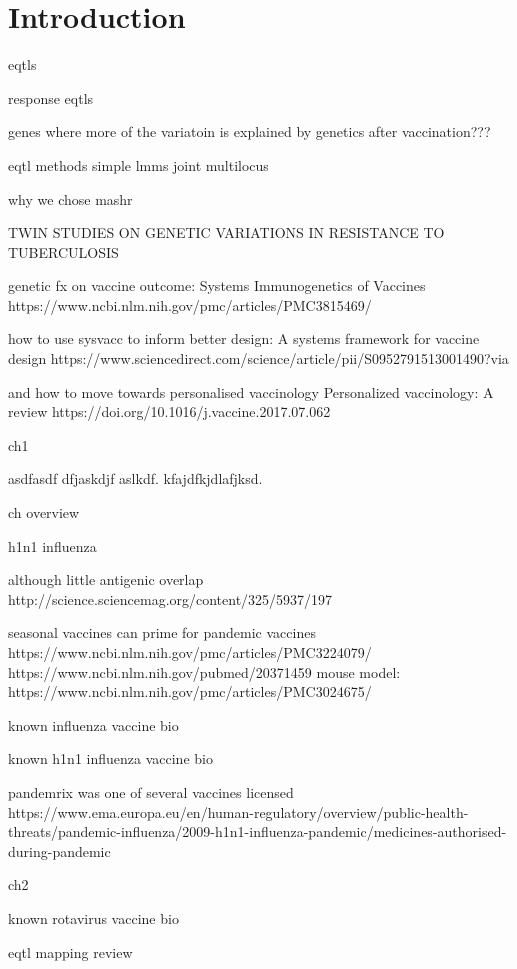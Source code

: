 %
%

\chapter{Introduction}

eqtls

response eqtls

    genes where more of the variatoin is explained by genetics after vaccination???

eqtl methods
simple
lmms
joint
multilocus

why we chose mashr

TWIN STUDIES ON GENETIC VARIATIONS IN RESISTANCE TO TUBERCULOSIS 

\autocite{Sobolev2016}




genetic fx on vaccine outcome:
Systems Immunogenetics of Vaccines
https://www.ncbi.nlm.nih.gov/pmc/articles/PMC3815469/

how to use sysvacc to inform better design:
A systems framework for vaccine design
https://www.sciencedirect.com/science/article/pii/S0952791513001490?via%

and how to move towards personalised vaccinology
Personalized vaccinology: A review
https://doi.org/10.1016/j.vaccine.2017.07.062

ch1

asdfasdf dfjaskdjf aslkdf. kfajdfkjdlafjksd.

ch overview

h1n1 influenza

although little antigenic overlap http://science.sciencemag.org/content/325/5937/197

seasonal vaccines can prime for pandemic vaccines
https://www.ncbi.nlm.nih.gov/pmc/articles/PMC3224079/
https://www.ncbi.nlm.nih.gov/pubmed/20371459
    mouse model: https://www.ncbi.nlm.nih.gov/pmc/articles/PMC3024675/


known influenza vaccine bio 

known h1n1 influenza vaccine bio 

pandemrix was one of several vaccines licensed
https://www.ema.europa.eu/en/human-regulatory/overview/public-health-threats/pandemic-influenza/2009-h1n1-influenza-pandemic/medicines-authorised-during-pandemic

ch2

known rotavirus vaccine bio

eqtl mapping review

